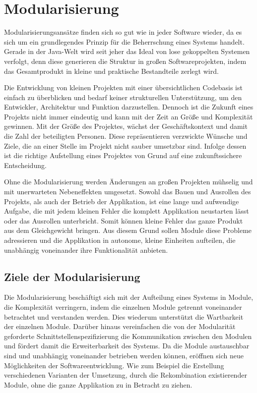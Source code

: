 \chapter{Modularisierung} \label{cha:modularisierung}

  Modularisierungsansätze finden sich so gut wie in jeder Software wieder, da es sich um ein grundlegendes Prinzip für die Beherrschung eines Systems handelt. Gerade in der Java-Welt wird seit jeher das Ideal von lose gekoppelten Systemen verfolgt, denn diese generieren die Struktur in großen Softwareprojekten, indem das Gesamtprodukt in kleine und praktische Bestandteile zerlegt wird. \bigbreak
  
  Die Entwicklung von kleinen Projekten mit einer übersichtlichen Codebasis ist einfach zu überblicken und bedarf keiner strukturellen Unterstützung, um den Entwickler, Architektur und Funktion darzustellen. Dennoch ist die Zukunft eines Projekts nicht immer eindeutig und kann mit der Zeit an Größe und Komplexität gewinnen. Mit der Größe des Projektes, wächst der Geschäftskontext und damit die Zahl der beteiligten Personen. Diese repräsentieren verzwickte Wünsche und Ziele, die an einer Stelle im Projekt nicht sauber umsetzbar sind. Infolge dessen ist die richtige Aufstellung eines Projektes von Grund auf eine zukunftssichere Entscheidung.\bigbreak 

  Ohne die Modularisierung werden Änderungen an großen Projekten mühselig und mit unerwarteten Nebeneffekten umgesetzt. Sowohl das Bauen und Ausrollen des Projekts, als auch der Betrieb der Applikation, ist eine lange und aufwendige Aufgabe, die mit jedem kleinen Fehler die komplett Applikation neustarten lässt oder das Ausrollen unterbricht. Somit können kleine Fehler das ganze Produkt aus dem Gleichgewicht bringen. Aus diesem Grund sollen Module diese Probleme adressieren und die Applikation in autonome, kleine Einheiten aufteilen, die unabhängig voneinander ihre Funktionalität anbieten.

  \section{Ziele der Modularisierung} \label{sec:ZdM}
    Die Modularisierung beschäftigt sich mit der Aufteilung eines Systems in Module, die Komplexität verringern, indem die einzelnen Module getrennt voneinander betrachtet und verstanden werden. Dies wiederum unterstützt die Wartbarkeit der einzelnen Module. Darüber hinaus vereinfachen die von der Modularität geforderte Schnittstellenspezifizierung die Kommunikation zwischen den Modulen und fördert damit die Erweiterbarkeit des Systems. Da die Module austauschbar sind und unabhängig voneinander betrieben werden können, eröffnen sich neue Möglichkeiten der Softwareentwicklung. Wie zum Beispiel die Erstellung verschiedenen Varianten der Umsetzung, durch die Rekombination existierender Module, ohne die ganze Applikation zu in Betracht zu ziehen.\cite{javaMod9,java9modRevealed,explorJava9}\bigbreak

